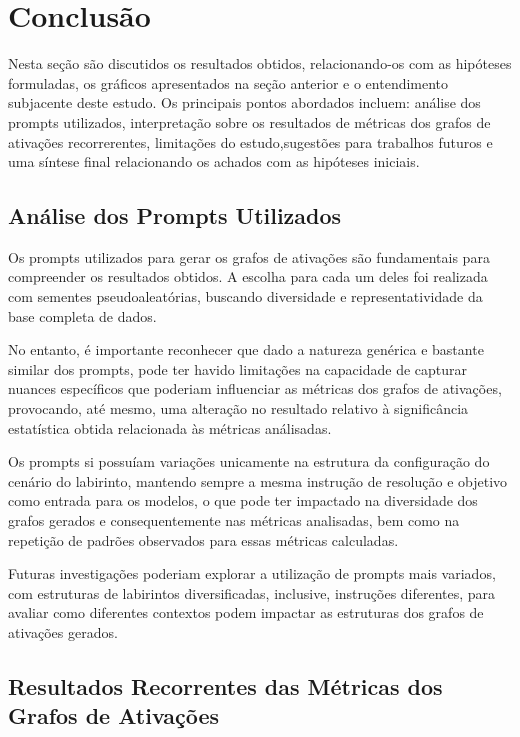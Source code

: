 \chapter{Conclusão}\label{cap:conclusoeseperspectivas}


Nesta seção são discutidos os resultados obtidos, relacionando-os com as hipóteses formuladas, os gráficos apresentados na seção anterior e o entendimento subjacente deste estudo. Os principais pontos abordados incluem: análise dos prompts utilizados, interpretação sobre os resultados de métricas dos grafos de ativações recorrerentes, limitações do estudo,sugestões para trabalhos futuros e uma síntese final relacionando os achados com as hipóteses iniciais.

\section{Análise dos Prompts Utilizados}

Os prompts utilizados para gerar os grafos de ativações são fundamentais para compreender os resultados obtidos. A escolha para cada um deles foi realizada com sementes pseudoaleatórias, buscando diversidade e representatividade da base completa de dados.

No entanto, é importante reconhecer que dado a natureza genérica e bastante similar dos prompts, pode ter havido limitações na capacidade de capturar nuances específicos que poderiam influenciar as métricas dos grafos de ativações, provocando, até mesmo, uma alteração no resultado relativo à significância estatística obtida relacionada às métricas análisadas.

Os prompts si possuíam variações unicamente na estrutura da configuração do cenário do labirinto, mantendo sempre a mesma instrução de resolução e objetivo como entrada para os modelos, o que pode ter impactado na diversidade dos grafos gerados e consequentemente nas métricas analisadas, bem como na repetição de padrões observados para essas métricas calculadas.

Futuras investigações poderiam explorar a utilização de prompts mais variados, com estruturas de labirintos diversificadas, inclusive, instruções diferentes, para avaliar como diferentes contextos podem impactar as estruturas dos grafos de ativações gerados.

\section{Resultados Recorrentes das Métricas dos Grafos de Ativações}

